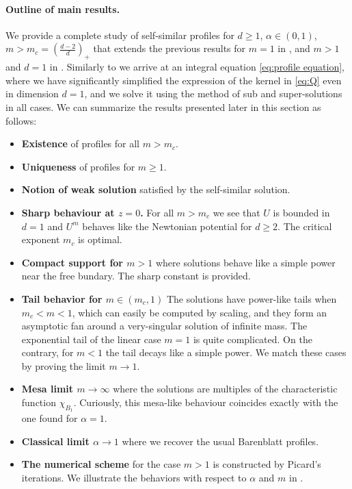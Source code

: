 \documentclass[a4paper]{article}
\theoremstyle{definition}
\begin{document}
\paragraph{Outline of main results.} 
We provide a complete study of self-similar profiles for $d \ge 1$, $\alpha \in (0,1)$, $m > m_c = (\tfrac{d-2}d)_+$ that extends the previous results for $m = 1$ in \cite{MR1829592,dier2020}, and $m > 1$ and $d=1$ in \cite{CaballeroOkrasinska-PlociniczakPlociniczakSadarangani2025}.
Similarly to \cite{CaballeroOkrasinska-PlociniczakPlociniczakSadarangani2025} we arrive at an integral equation \eqref{eq:profile equation}, where we have significantly simplified the expression of the kernel in \eqref{eq:Q} even in dimension $d=1$, and we solve it using the method of sub and super-solutions in all cases.
%
We can summarize the results presented later in this section as follows:
\begin{itemize}
  \item \textbf{Existence} of profiles for all $m>m_c$.

    \item \textbf{Uniqueness} of profiles for $m\ge 1$.
    
  \item \textbf{Notion of weak solution} satisfied by the self-similar solution.
  
  \item \textbf{Sharp behaviour at $z=0$.}
  For all $m > m_c$ we see that $U$ is bounded in $d=1$ and $U^m$ behaves like the Newtonian potential for $d \ge 2$. The critical exponent $m_c$ is optimal. 
  
    \item \textbf{Compact support for $m > 1$} where solutions behave like a simple power near the free bundary. The sharp constant is provided.

    \item \textbf{Tail behavior for $m \in (m_c,1)$} 
    The solutions have power-like tails when $m_c < m < 1$, which can easily be computed by scaling, and they form an asymptotic fan around a very-singular solution of infinite mass.
    The exponential tail of the linear case $m=1$ is quite complicated. On the contrary, for $m< 1$ the tail decays like a simple power.
    We match these cases by proving the limit $m \to 1$.

  \item \textbf{Mesa limit $m\rightarrow \infty$} where the solutions are multiples of the characteristic function $\chi_{B_1}$. Curiously, this mesa-like behaviour coincides exactly with the one found for $\alpha=1$.

    \item \textbf{Classical limit $\alpha \to 1$} where we recover the usual Barenblatt profiles.
  
  \item \textbf{The numerical scheme} for the case $m>1$ is constructed by Picard's iterations. We illustrate the behaviors with respect to $\alpha$ and $m$ in . 
\end{itemize}
\normalcolor
\end{document}
